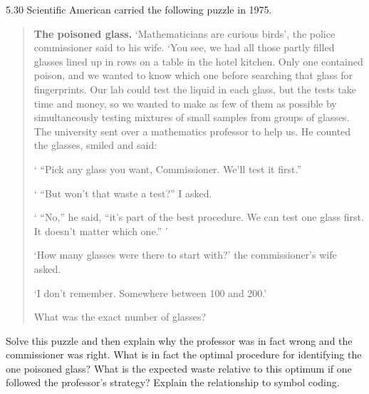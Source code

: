 \documentclass[12pt, a4paper]{article}
\begin{document}
\begin{prob}{5.30}
    Scientific American carried the following puzzle in 1975.

\begin{quotation}
\noindent \textbf{The poisoned glass.} `Mathematicians are curious birds', the police commissioner said to his wife.
`You see, we had all those partly filled glasses lined up in rows on a table in the hotel kitchen.
Only one contained poison, and we wanted to know which one before searching that glass for fingerprints.
Our lab could test the liquid in each glass, but the tests take time and money, so we wanted to make as few of them as possible by simultaneously testing mixtures of small samples from groups of glasses.
The university sent over a mathematics professor to help us. He counted the glasses, smiled and said:

` ``Pick any glass you want, Commissioner. We'll test it first.''

` ``But won't that waste a test?'' I asked.

` ``No,'' he said, ``it's part of the best procedure. We can test one glass first. It doesn't matter which one.'' '

`How many glasses were there to start with?' the commissioner's wife asked.

`I don't remember. Somewhere between 100 and 200.'

What was the exact number of glasses?
\end{quotation}

\noindent Solve this puzzle and then explain why the professor was in fact wrong and the commissioner was right.
What is in fact the optimal procedure for identifying the one poisoned glass?
What is the expected waste relative to this optimum if one followed the professor's strategy?
Explain the relationship to symbol coding.
\end{prob}
\end{document}
